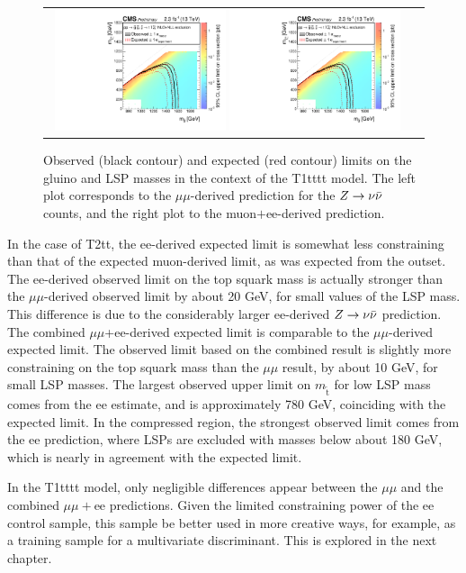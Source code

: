 \begin{figure}[htbp]
  \begin{center}
  \begin{tabular}{cc}
\hspace{-1.5cm}
  \includegraphics[angle=0,width=0.48\textwidth]{figures/SusySearches/HadStop2015/HadStopT1tttt_Mu.pdf}
  \includegraphics[angle=0,width=0.48\textwidth]{figures/SusySearches/HadStop2015/HadStopT1tttt_MuEl.pdf}
  \end{tabular}
  \caption{Observed (black contour) and expected (red contour) limits on the gluino and LSP masses in the context of the T1tttt model. The left plot corresponds to the $\mu\mu$-derived prediction for the $Z\rightarrow \nu\bar{\nu}$ counts, and the right plot to the muon$+$ee-derived prediction.}
    \label{fig:fulllimit_T1tttt}
  \end{center}
\end{figure}
In the case of T2tt, the ee-derived expected limit is somewhat less constraining than that of the expected muon-derived limit, as was expected from the outset. The ee-derived observed limit on the top squark mass is actually stronger than the $\mu\mu$-derived observed limit by about 20 GeV, for small values of the LSP mass. This difference is due to the considerably larger ee-derived $Z\rightarrow \nu\bar{\nu}$ prediction. The combined $\mu\mu$+ee-derived expected limit is comparable to the $\mu\mu$-derived expected limit. The observed limit based on the combined result is slightly more constraining on the top squark mass than the $\mu\mu$ result, by about 10 GeV, for small LSP masses. The largest observed upper limit on $m_{\tilde{\text{t}}}$ for low LSP mass comes from the ee estimate, and is approximately 780 GeV, coinciding with the expected limit. In the compressed region, the strongest observed limit comes from the ee prediction, where LSPs are excluded with masses below about 180 GeV, which is nearly in agreement with the expected limit.

In the T1tttt model, only negligible differences appear between the $\mu\mu$ and the combined $\mu\mu+$ee predictions. Given the limited constraining power of the ee control sample, this sample be better used in more creative ways, for example, as a training sample for a multivariate discriminant. This is explored in the next chapter.

